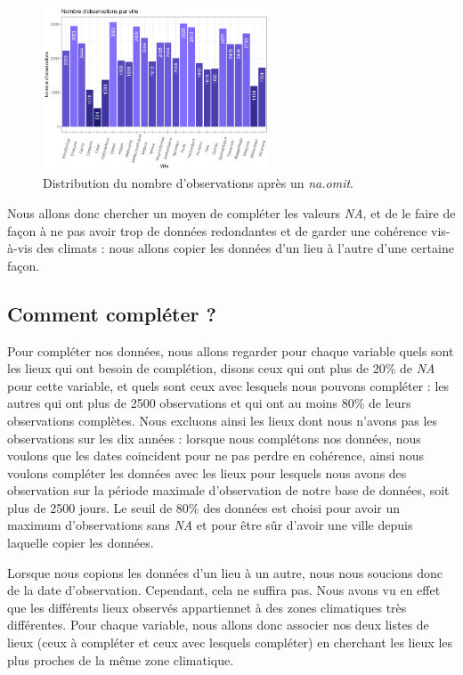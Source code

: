 \documentclass{article}
\begin{document}
\begin{figure}[H]
    \centering
    \includegraphics[width=0.6\textwidth]{Images/distribution_lieux_raw.png}
    \caption{Distribution du nombre d'observations après un \emph{na.omit}.}
    \label{fig:distrib_raw}
\end{figure}

Nous allons donc chercher un moyen de compléter les valeurs \emph{NA}, et de le faire de façon à ne pas avoir trop de données redondantes et de garder une cohérence vis-à-vis des climats : nous allons copier les données d'un lieu à l'autre d'une certaine façon.

\subsection{Comment compléter ?}

Pour compléter nos données, nous allons regarder pour chaque variable quels sont les lieux qui ont besoin de complétion, disons ceux qui ont plus de 20\% de \emph{NA} pour cette variable, et quels sont ceux avec lesquels nous pouvons compléter : les autres qui ont plus de 2500 observations et qui ont au moins 80\% de leurs observations complètes. Nous excluons ainsi les lieux dont nous n'avons pas les observations sur les dix années : lorsque nous complétons nos données, nous voulons que les dates coincident pour ne pas perdre en cohérence, ainsi nous voulons compléter les données avec les lieux pour lesquels nous avons des observation sur la période maximale d'observation de notre base de données, soit plus de 2500 jours. Le seuil de 80\% des données est choisi pour avoir un maximum d'observations sans \emph{NA} et pour être sûr d'avoir une ville depuis laquelle copier les données.

Lorsque nous copions les données d'un lieu à un autre, nous nous soucions donc de la date d'observation. Cependant, cela ne suffira pas. Nous avons vu en effet que les différents lieux observés appartiennet à des zones climatiques très différentes. Pour chaque variable, nous allons donc associer nos deux listes de lieux (ceux à compléter et ceux avec lesquels compléter) en cherchant les lieux les plus proches de la même zone climatique.
\end{document}
